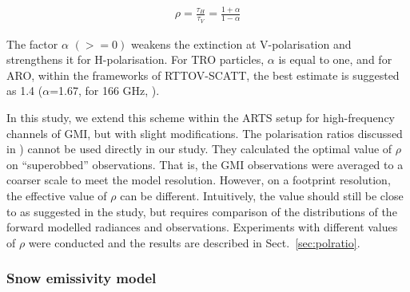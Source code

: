 \documentclass[amt, manuscript]{copernicus}
\newcommand{\todo}[1]{{\color{red} #1}}
\begin{document}
\begin{eqnarray}
\rho = \frac{\tau_H}{\tau_V} = \frac{1+\alpha}{1-\alpha}
\end{eqnarray}

The factor $\alpha$ $(>= 0)$  weakens the extinction at V-polarisation and strengthens it for H-polarisation. For TRO particles, $\alpha$ is equal to one, and for ARO, within the frameworks of RTTOV-SCATT, the best estimate is suggested as 1.4 ($\alpha$=1.67, for 166\,\,GHz, \citep{barlakas:intro:21}).

In this study, we extend this scheme within the ARTS setup for high-frequency channels of GMI, but with slight modifications. The polarisation ratios discussed in \citep{barlakas:intro:21}) cannot be used directly in our study. They calculated the optimal value of $\rho$ on ``superobbed'' observations. That is, the GMI observations were averaged to a coarser scale to meet the model resolution. However, on a footprint resolution, the effective value of $\rho$ can be different.  Intuitively, the value should still be close to as suggested in the study, but requires comparison of the distributions of the forward modelled radiances and observations. Experiments with different values of $\rho$ were conducted and the results are described in Sect.~\ref{sec:polratio}.




\subsubsection{Snow emissivity model}
\label{sec:snow_emissivity}
\end{document}
